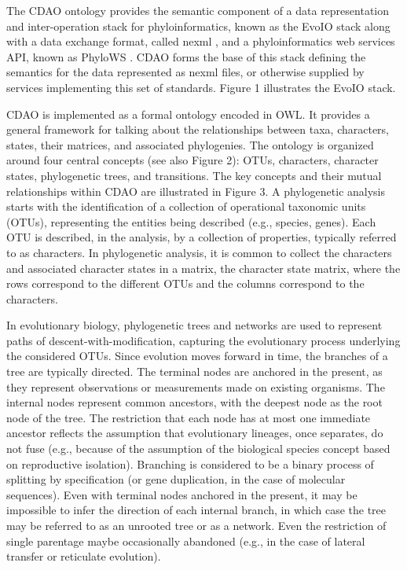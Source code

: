\documentclass[10pt]{article}
\begin{document}
The CDAO ontology provides the semantic component of a data representation and
inter-operation stack for phyloinformatics, known as the EvoIO stack \cite{evoio}along
with a data exchange format, called nexml \cite{nexml}, and a phyloinformatics web
services API, known as PhyloWS \cite{phylows}. CDAO forms the base of this stack defining
the semantics for the data represented as nexml files, or otherwise supplied by
services implementing this set of standards.  Figure 1 illustrates the EvoIO
stack.


CDAO is implemented as a formal ontology encoded in OWL. It provides a general
framework for talking about the relationships between taxa, characters, states,
their matrices, and associated phylogenies. The ontology is organized around
four central concepts (see also Figure 2): OTUs, characters, character states,
phylogenetic trees, and transitions. The key concepts and their mutual
relationships within CDAO are illustrated in Figure 3.  A phylogenetic analysis
starts with the identification of a collection of operational taxonomic units
(OTUs), representing the entities being described (e.g., species, genes). Each
OTU is described, in the analysis, by a collection of properties, typically
referred to as characters. In phylogenetic analysis, it is common to collect
the characters and associated character states in a matrix, the character state
matrix, where the rows correspond to the different OTUs and the columns
correspond to the characters.


In evolutionary biology, phylogenetic trees and networks are used to represent
paths of descent-with-modification, capturing the evolutionary process
underlying the considered OTUs.  Since evolution moves forward in time, the
branches of a tree are typically directed. The terminal nodes are anchored in
the present, as they represent observations or measurements made on existing
organisms. The internal nodes represent common ancestors, with the deepest node
as the root node of the tree. The restriction that each node has at most one
immediate ancestor reflects the assumption that evolutionary lineages, once
separates, do not fuse (e.g., because of the assumption of the biological
species concept based on reproductive isolation). Branching is considered to be
a binary process of splitting by specification (or gene duplication, in the
case of molecular sequences). Even with terminal nodes anchored in the present,
it may be impossible to infer the direction of each internal branch, in which
case the tree may be referred to as an unrooted tree or as a network. Even the
restriction of single parentage maybe occasionally abandoned (e.g., in the case
of lateral transfer or reticulate evolution).
\end{document}
